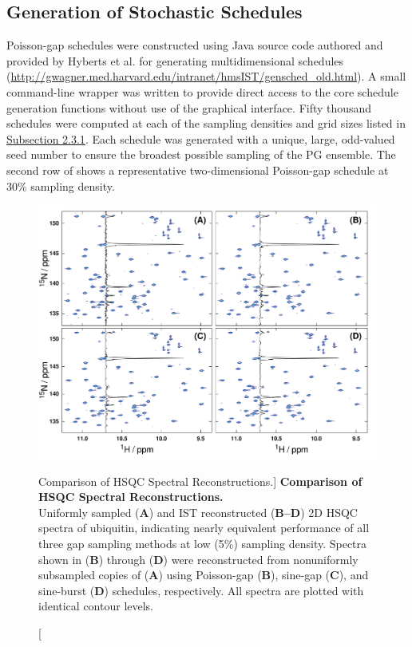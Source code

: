\subsection{Generation of Stochastic Schedules}

\begin{doublespace}
Poisson-gap schedules were constructed using Java source code authored and
provided by Hyberts et al. for generating multidimensional schedules
(\url{http://gwagner.med.harvard.edu/intranet/hmsIST/gensched_old.html}).
A small command-line wrapper was written to provide direct access to the
core schedule generation functions without use of the graphical interface.
Fifty thousand schedules were computed at each of the sampling densities
and grid sizes listed in \hyperlink{subsection.2.3.1}{Subsection 2.3.1}.
Each schedule was generated with a unique, large, odd-valued seed number
to ensure the broadest possible sampling of the PG ensemble. The second
row of  shows a representative two-dimensional
Poisson-gap schedule at 30\% sampling density.
\end{doublespace}

\begin{figure}[ht!]
\includegraphics[width=6in]{figs/dgs/06-hsqc.png}
\caption
      [Comparison of HSQC Spectral Reconstructions.]{
  {\bf Comparison of HSQC Spectral Reconstructions.}
  \\
  Uniformly sampled ({\bf A}) and IST reconstructed ({\bf B--D}) 2D \hnnmr{}
  HSQC spectra of ubiquitin, indicating nearly equivalent performance of all
  three gap sampling methods at low (5\%) sampling density. Spectra shown in
  ({\bf B}) through ({\bf D}) were reconstructed from nonuniformly subsampled
  copies of ({\bf A}) using Poisson-gap ({\bf B}), sine-gap ({\bf C}), and
  sine-burst ({\bf D}) schedules, respectively. All spectra are plotted with
  identical contour levels.
}
\label{figure.2.6}
\end{figure}

